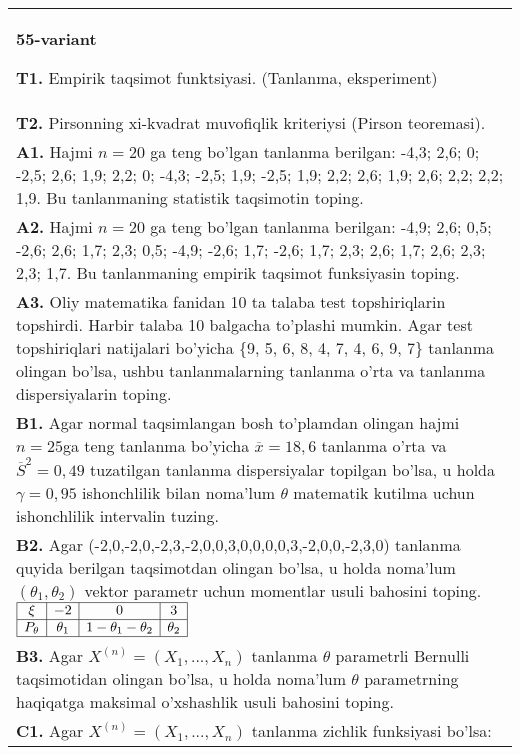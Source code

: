 \documentclass{article}
\begin{document}
\begin{tabular}{m{17cm}}
\textbf{55-variant}
\newline

\textbf{T1.} 
Empirik taqsimot funktsiyasi. (Tanlanma, eksperiment)
\\
\textbf{T2.} 
Pirsonning xi-kvadrat muvofiqlik kriteriysi (Pirson teoremasi).
\\
\textbf{A1.} 
Hajmi \(n = 20\) ga teng bo'lgan tanlanma berilgan: -4,3; 2,6; 0; -2,5; 2,6; 1,9; 2,2; 0; -4,3; -2,5; 1,9; -2,5; 1,9; 2,2; 2,6; 1,9; 2,6; 2,2; 2,2; 1,9. Bu tanlanmaning statistik taqsimotin toping.
\\
\textbf{A2.} 
Hajmi \(n = 20\) ga teng bo'lgan tanlanma berilgan: -4,9; 2,6; 0,5; -2,6; 2,6; 1,7; 2,3; 0,5; -4,9; -2,6; 1,7; -2,6; 1,7; 2,3; 2,6; 1,7; 2,6; 2,3; 2,3; 1,7. Bu tanlanmaning empirik taqsimot funksiyasin toping.
\\
\textbf{A3.} 
Oliy matematika fanidan 10 ta talaba test topshiriqlarin topshirdi. Harbir talaba 10 balgacha to'plashi mumkin. Agar test topshiriqlari natijalari bo'yicha \{9, 5, 6, 8, 4, 7, 4, 6, 9, 7\} tanlanma olingan bo'lsa, ushbu tanlanmalarning tanlanma o'rta va tanlanma dispersiyalarin toping.
\\
\textbf{B1.} 
Agar normal taqsimlangan bosh to'plamdan olingan hajmi \(n = 25\)ga teng tanlanma bo'yicha \(\overline{x} = 18,6\) tanlanma o'rta va \({\overline{S}}^{2} = 0,49\) tuzatilgan tanlanma dispersiyalar topilgan bo'lsa, u holda \(\gamma = 0,95\) ishonchlilik bilan noma'lum \(\theta\) matematik kutilma uchun ishonchlilik intervalin tuzing.
\\
\textbf{B2.} 
Agar (-2,0,-2,0,-2,3,-2,0,0,3,0,0,0,0,3,-2,0,0,-2,3,0) tanlanma quyida berilgan taqsimotdan olingan bo'lsa, u holda noma'lum \(\left( \theta_{1},\theta_{2} \right)\) vektor parametr uchun momentlar usuli bahosini toping.
$\begin{array}{|c|c|c|c|}
    \hline
    \xi & - 2 & 0 & 3\\
    \hline
    P_{\theta} & \theta_{1} & 1 - \theta_{1} - \theta_{2} & \theta_{2} \\
    \hline
\end{array}$
\\
\textbf{B3.} 
Agar \(X^{(n)} = \left( X_{1},...,X_{n} \right)\) tanlanma \(\theta\) parametrli Bernulli taqsimotidan olingan bo'lsa, u holda noma'lum \(\theta\) parametrning haqiqatga maksimal o'xshashlik usuli bahosini toping.
\\
\textbf{C1.} 
Agar \(X^{(n)} = \left( X_{1},...,X_{n} \right)\) tanlanma zichlik funksiyasi bo'lsa: \(f(x,\theta) = \left\{ \begin{matrix}

\end{matrix}
\end{tabular}
\end{document}
